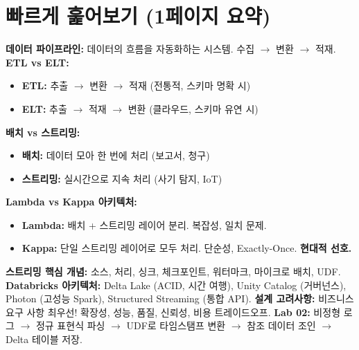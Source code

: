 \documentclass[11pt,a4paper]{article}
\theoremstyle{definition}
\begin{document}
\newpage
\section{빠르게 훑어보기 (1페이지 요약)}

\begin{tcolorbox}[summarybox, title={데이터 파이프라인 핵심 요약}]
\textbf{데이터 파이프라인:} 데이터의 흐름을 자동화하는 시스템. 수집 $\rightarrow$ 변환 $\rightarrow$ 적재.
\textbf{ETL vs ELT:}
\begin{itemize}
    \item \textbf{ETL:} 추출 $\rightarrow$ 변환 $\rightarrow$ 적재 (전통적, 스키마 명확 시)
    \item \textbf{ELT:} 추출 $\rightarrow$ 적재 $\rightarrow$ 변환 (클라우드, 스키마 유연 시)
\end{itemize}
\textbf{배치 vs 스트리밍:}
\begin{itemize}
    \item \textbf{배치:} 데이터 모아 한 번에 처리 (보고서, 청구)
    \item \textbf{스트리밍:} 실시간으로 지속 처리 (사기 탐지, IoT)
\end{itemize}
\textbf{Lambda vs Kappa 아키텍처:}
\begin{itemize}
    \item \textbf{Lambda:} 배치 + 스트리밍 레이어 분리. 복잡성, 일치 문제.
    \item \textbf{Kappa:} 단일 스트리밍 레이어로 모두 처리. 단순성, Exactly-Once. \textbf{현대적 선호.}
\end{itemize}
\textbf{스트리밍 핵심 개념:} 소스, 처리, 싱크, 체크포인트, 워터마크, 마이크로 배치, UDF.
\textbf{Databricks 아키텍처:} Delta Lake (ACID, 시간 여행), Unity Catalog (거버넌스), Photon (고성능 Spark), Structured Streaming (통합 API).
\textbf{설계 고려사항:} 비즈니스 요구 사항 최우선! 확장성, 성능, 품질, 신뢰성, 비용 트레이드오프.
\textbf{Lab 02:} 비정형 로그 $\rightarrow$ 정규 표현식 파싱 $\rightarrow$ UDF로 타임스탬프 변환 $\rightarrow$ 참조 데이터 조인 $\rightarrow$ Delta 테이블 저장.
\end{tcolorbox}
\end{document}
